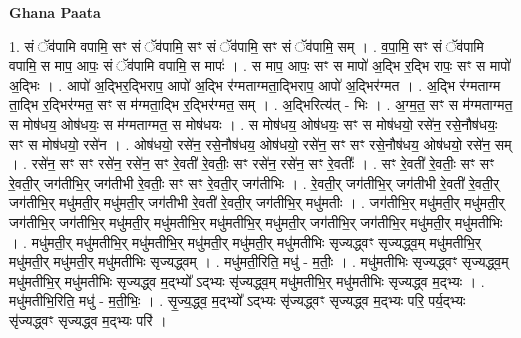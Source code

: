 \documentclass[17pt]{extarticle}
\begin{document}
\textbf{Ghana Paata } \newline

1. सं ॅव॑पामि वपामि॒ सꣳ सं ॅव॑पामि॒ सꣳ सं ॅव॑पामि॒ सꣳ सं ॅव॑पामि॒ सम् । . व॒पा॒मि॒ सꣳ सं ॅव॑पामि वपामि॒ स माप॒ आपः॒ सं ॅव॑पामि वपामि॒ स मापः॑ । . स माप॒ आपः॒ सꣳ स मापो॑ अ॒द्भि र॒द्भि रापः॒ सꣳ स मापो॑ अ॒द्भिः । . आपो॑ अ॒द्भिर॒द्भिराप॒ आपो॑ अ॒द्भि र॑ग्मताग्मता॒द्भिराप॒ आपो॑ अ॒द्भिर॑ग्मत । . अ॒द्भि र॑ग्मताग्म ता॒द्भि र॒द्भिर॑ग्मत॒ सꣳ स म॑ग्मता॒द्भि र॒द्भिर॑ग्मत॒ सम् । . अ॒द्भिरित्य॑त् - भिः । . अ॒ग्म॒त॒ सꣳ स म॑ग्मताग्मत॒ स मोष॑धय॒ ओष॑धयः॒ स म॑ग्मताग्मत॒ स मोष॑धयः । . स मोष॑धय॒ ओष॑धयः॒ सꣳ स मोष॑धयो॒ रसे॑न॒ रसे॒नौष॑धयः॒ सꣳ स मोष॑धयो॒ रसे॑न । . ओष॑धयो॒ रसे॑न॒ रसे॒नौष॑धय॒ ओष॑धयो॒ रसे॑न॒ सꣳ सꣳ रसे॒नौष॑धय॒ ओष॑धयो॒ रसे॑न॒ सम् । . रसे॑न॒ सꣳ सꣳ रसे॑न॒ रसे॑न॒ सꣳ रे॒वती॑ रे॒वतीः॒ सꣳ रसे॑न॒ रसे॑न॒ सꣳ रे॒वतीः᳚ । . सꣳ रे॒वती॑ रे॒वतीः॒ सꣳ सꣳ रे॒वती॒र् जग॑तीभि॒र् जग॑तीभी रे॒वतीः॒ सꣳ सꣳ रे॒वती॒र् जग॑तीभिः । . रे॒वती॒र् जग॑तीभि॒र् जग॑तीभी रे॒वती॑ रे॒वती॒र् जग॑तीभि॒र् मधु॑मती॒र् मधु॑मती॒र् जग॑तीभी रे॒वती॑ रे॒वती॒र् जग॑तीभि॒र् मधु॑मतीः । . जग॑तीभि॒र् मधु॑मती॒र् मधु॑मती॒र् जग॑तीभि॒र् जग॑तीभि॒र् मधु॑मती॒र् मधु॑मतीभि॒र् मधु॑मतीभि॒र् मधु॑मती॒र् जग॑तीभि॒र् जग॑तीभि॒र् मधु॑मती॒र् मधु॑मतीभिः । . मधु॑मती॒र् मधु॑मतीभि॒र् मधु॑मतीभि॒र् मधु॑मती॒र् मधु॑मती॒र् मधु॑मतीभिः सृज्यद्ध्वꣳ सृज्यद्ध्व॒म् मधु॑मतीभि॒र् मधु॑मती॒र् मधु॑मती॒र् मधु॑मतीभिः सृज्यद्ध्वम् । . मधु॑मती॒रिति॒ मधु॑ - म॒तीः॒ । . मधु॑मतीभिः सृज्यद्ध्वꣳ सृज्यद्ध्व॒म् मधु॑मतीभि॒र् मधु॑मतीभिः सृज्यद्ध्व म॒द्भ्यो᳚ ऽद्भ्यः सृ॑ज्यद्ध्व॒म् मधु॑मतीभि॒र् मधु॑मतीभिः सृज्यद्ध्व म॒द्भ्यः । . मधु॑मतीभि॒रिति॒ मधु॑ - म॒ती॒भिः॒ । . सृ॒ज्य॒द्ध्व॒ म॒द्भ्यो᳚ ऽद्भ्यः सृ॑ज्यद्ध्वꣳ सृज्यद्ध्व म॒द्भ्यः परि॒ पर्य॒द्भ्यः सृ॑ज्यद्ध्वꣳ सृज्यद्ध्व म॒द्भ्यः परि॑ । \newline
\end{document}
